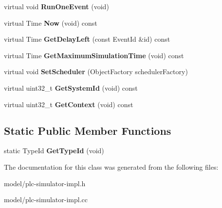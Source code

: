 \begin{DoxyCompactItemize}
\item 
\hypertarget{classns3_1_1PLC__SimulatorImpl_a6f73113500c1ead03f0932a32795d2ed}{virtual void {\bfseries \-Run\-One\-Event} (void)}\label{classns3_1_1PLC__SimulatorImpl_a6f73113500c1ead03f0932a32795d2ed}

\item 
\hypertarget{classns3_1_1PLC__SimulatorImpl_a3780d96092321116d752796e2066bc8f}{virtual \-Time {\bfseries \-Now} (void) const }\label{classns3_1_1PLC__SimulatorImpl_a3780d96092321116d752796e2066bc8f}

\item 
\hypertarget{classns3_1_1PLC__SimulatorImpl_ac61af13440b6efcd65a7c94c69efa20d}{virtual \-Time {\bfseries \-Get\-Delay\-Left} (const \-Event\-Id \&id) const }\label{classns3_1_1PLC__SimulatorImpl_ac61af13440b6efcd65a7c94c69efa20d}

\item 
\hypertarget{classns3_1_1PLC__SimulatorImpl_afd731d738f76ca2b7ff78ccdf16d6b04}{virtual \-Time {\bfseries \-Get\-Maximum\-Simulation\-Time} (void) const }\label{classns3_1_1PLC__SimulatorImpl_afd731d738f76ca2b7ff78ccdf16d6b04}

\item 
\hypertarget{classns3_1_1PLC__SimulatorImpl_a9ceda84e785e4050c0583264d59a92ad}{virtual void {\bfseries \-Set\-Scheduler} (\-Object\-Factory scheduler\-Factory)}\label{classns3_1_1PLC__SimulatorImpl_a9ceda84e785e4050c0583264d59a92ad}

\item 
\hypertarget{classns3_1_1PLC__SimulatorImpl_af2e335fdd9bc839824e3e80188b21d7c}{virtual uint32\-\_\-t {\bfseries \-Get\-System\-Id} (void) const }\label{classns3_1_1PLC__SimulatorImpl_af2e335fdd9bc839824e3e80188b21d7c}

\item 
\hypertarget{classns3_1_1PLC__SimulatorImpl_a4c93b978cceceb9ade41a1771f044a28}{virtual uint32\-\_\-t {\bfseries \-Get\-Context} (void) const }\label{classns3_1_1PLC__SimulatorImpl_a4c93b978cceceb9ade41a1771f044a28}

\end{DoxyCompactItemize}
\subsection*{\-Static \-Public \-Member \-Functions}
\begin{DoxyCompactItemize}
\item 
\hypertarget{classns3_1_1PLC__SimulatorImpl_ac0dfacefc0814f1ee18c3f587b36434f}{static \-Type\-Id {\bfseries \-Get\-Type\-Id} (void)}\label{classns3_1_1PLC__SimulatorImpl_ac0dfacefc0814f1ee18c3f587b36434f}

\end{DoxyCompactItemize}


\-The documentation for this class was generated from the following files\-:\begin{DoxyCompactItemize}
\item 
model/plc-\/simulator-\/impl.\-h\item 
model/plc-\/simulator-\/impl.\-cc\end{DoxyCompactItemize}
